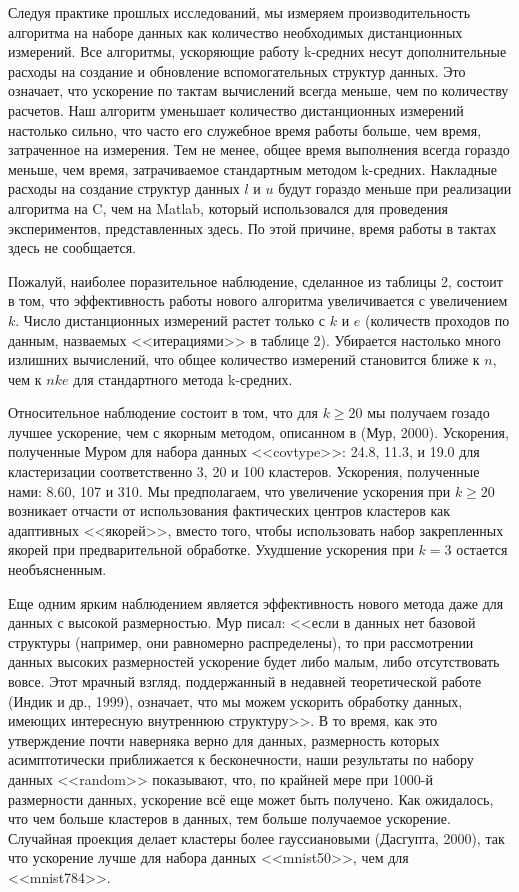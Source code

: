 Следуя практике прошлых исследований, мы измеряем производительность алгоритма на наборе данных как количество необходимых дистанционных измерений. Все алгоритмы, ускоряющие работу k-средних несут дополнительные расходы на создание и обновление вспомогательных структур данных. Это означает, что ускорение по тактам вычислений всегда меньше, чем по количеству расчетов. Наш алгоритм уменьшает количество дистанционных измерений настолько сильно, что часто его служебное время работы больше, чем время, затраченное на измерения. Тем не менее, общее время выполнения всегда гораздо меньше, чем время, затрачиваемое стандартным методом k-средних. Накладные расходы на создание структур данных \( l \) и \( u \) будут гораздо меньше при реализации алгоритма на C, чем на Matlab, который использовался для проведения экспериментов, представленных здесь. По этой причине, время работы в тактах здесь не сообщается.

Пожалуй, наиболее поразительное наблюдение, сделанное из таблицы 2, состоит в том, что эффективность работы нового алгоритма увеличивается с увеличением \( k \). Число дистанционных измерений растет только с \( k \) и \( e \) (количеств проходов по данным, назваемых <<итерациями>> в таблице 2). Убирается настолько много излишних вычислений, что общее количество измерений становится ближе к \( n \), чем к \( nke \) для стандартного метода k-средних.

Относительное наблюдение состоит в том, что для \( k \ge 20 \) мы получаем гозадо лучшее ускорение, чем с якорным методом, описанном в (Мур, 2000). Ускорения, полученные Муром для набора данных <<covtype>>: 24.8, 11.3, и 19.0 для кластеризации соответственно 3, 20 и 100 кластеров. Ускорения, полученные нами: 8.60, 107 и 310. Мы предполагаем, что увеличение ускорения при \( k \ge 20 \) возникает отчасти от использования фактических центров кластеров как адаптивных <<якорей>>, вместо того, чтобы использовать набор закрепленных якорей при предварительной обработке. Ухудшение ускорения при \( k = 3 \) остается необъясненным.

Еще одним ярким наблюдением является эффективность нового метода даже для данных с высокой размерностью. Мур писал: <<если в данных нет базовой структуры (например, они равномерно распределены), то при рассмотрении данных высоких размерностей ускорение будет либо малым, либо отсутствовать вовсе. Этот мрачный взгляд, поддержанный в недавней теоретической работе (Индик и др., 1999), означает, что мы можем ускорить обработку данных, имеющих интересную внутреннюю структуру>>. В то время, как это утверждение почти наверняка верно для данных, размерность которых асимптотически приближается к бесконечности, наши результаты по набору данных <<random>> показывают, что, по крайней мере при 1000-й размерности данных, ускорение всё еще может быть получено. Как ожидалось, что чем больше кластеров в данных, тем больше получаемое ускорение. Случайная проекция делает кластеры более гауссиановыми (Дасгупта, 2000), так что ускорение лучше для набора данных <<mnist50>>, чем для <<mnist784>>.

